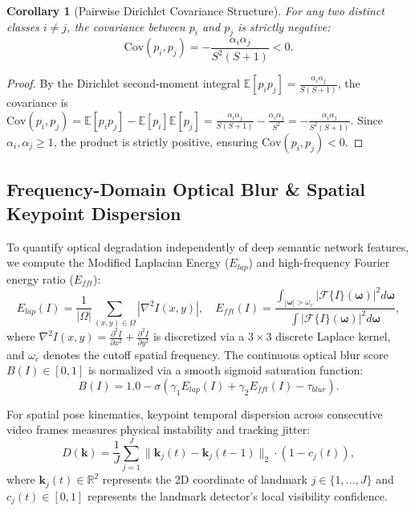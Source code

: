\documentclass[conference]{IEEEtran}
\newtheorem{corollary}{Corollary}
\begin{document}
\begin{corollary}[Pairwise Dirichlet Covariance Structure]
For any two distinct classes $i \ne j$, the covariance between $p_i$ and $p_j$ is strictly negative:
\begin{equation}
\mathrm{Cov}(p_i, p_j) = -\frac{\alpha_i \alpha_j}{S^2 (S + 1)} < 0.
\end{equation}
\end{corollary}
\begin{proof}
By the Dirichlet second-moment integral $\mathbb{E}[p_i p_j] = \frac{\alpha_i \alpha_j}{S(S+1)}$, the covariance is $\mathrm{Cov}(p_i, p_j) = \mathbb{E}[p_i p_j] - \mathbb{E}[p_i]\mathbb{E}[p_j] = \frac{\alpha_i \alpha_j}{S(S+1)} - \frac{\alpha_i \alpha_j}{S^2} = -\frac{\alpha_i \alpha_j}{S^2 (S + 1)}$. Since $\alpha_i, \alpha_j \ge 1$, the product is strictly positive, ensuring $\mathrm{Cov}(p_i, p_j) < 0$.
\end{proof}

\subsection{Frequency-Domain Optical Blur & Spatial Keypoint Dispersion}
To quantify optical degradation independently of deep semantic network features, we compute the Modified Laplacian Energy ($E_{lap}$) and high-frequency Fourier energy ratio ($E_{fft}$):
\begin{equation}
E_{lap}(I) = \frac{1}{|\Omega|} \sum_{(x,y) \in \Omega} |\nabla^2 I(x,y)|, \quad E_{fft}(I) = \frac{\int_{|\boldsymbol{\omega}| > \omega_c} |\mathcal{F}\{I\}(\boldsymbol{\omega})|^2 d\boldsymbol{\omega}}{\int |\mathcal{F}\{I\}(\boldsymbol{\omega})|^2 d\boldsymbol{\omega}},
\end{equation}
where $\nabla^2 I(x, y) = \frac{\partial^2 I}{\partial x^2} + \frac{\partial^2 I}{\partial y^2}$ is discretized via a $3 \times 3$ discrete Laplace kernel, and $\omega_c$ denotes the cutoff spatial frequency. The continuous optical blur score $B(I) \in [0, 1]$ is normalized via a smooth sigmoid saturation function:
\begin{equation}
B(I) = 1.0 - \sigma\left( \gamma_1 E_{lap}(I) + \gamma_2 E_{fft}(I) - \tau_{blur} \right).
\end{equation}

For spatial pose kinematics, keypoint temporal dispersion across consecutive video frames measures physical instability and tracking jitter:
\begin{equation}
D(\mathbf{k}) = \frac{1}{J} \sum_{j=1}^J \|\mathbf{k}_j(t) - \mathbf{k}_j(t-1)\|_2 \cdot (1 - c_j(t)),
\end{equation}
where $\mathbf{k}_j(t) \in \mathbb{R}^2$ represents the 2D coordinate of landmark $j \in \{1, \dots, J\}$ and $c_j(t) \in [0, 1]$ represents the landmark detector's local visibility confidence.
\end{document}
